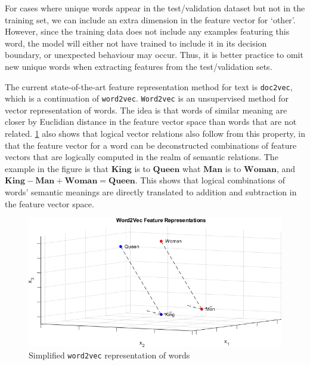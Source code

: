 \documentclass[12pt,a4paper,twoside,openright]{report}
\renewcommand{\vec}[1]{\mathbf{#1}}
\begin{document}
For cases where unique words appear in the test/validation
dataset but not in the training set, we can include an extra dimension in the feature
vector for `other'. However, since the training data does not include any examples featuring
this word, the model will either not have trained to include it in its decision boundary, or unexpected
behaviour may occur. Thus, it is better practice to omit new unique words when extracting features
from the test/validation sets.

The current state-of-the-art feature representation method for text is \texttt{doc2vec}\cite{Le14},
which is a continuation of \texttt{word2vec}\cite{Mikolov13}. \texttt{Word2vec} is an unsupervised method
for vector representation of words. The idea is that words of similar meaning are closer by Euclidian distance in the feature vector space than
words that are not related. \cref{fig:word2vec} also shows that logical vector relations 
also follow from this property, in that the feature vector for a word can be deconstructed
combinations of feature vectors that are logically computed in the realm of semantic relations.
The example in the figure is that $\vec{King}$ is to $\vec{Queen}$ what $\vec{Man}$ is to $\vec{Woman}$,
and $\vec{King} - \vec{Man} + \vec{Woman} = \vec{Queen}$. This shows that
logical combinations of words' semantic meanings are directly translated to addition and subtraction in
the feature vector space.

\begin{figure}[H]
\centering
\vspace{10pt}
\includegraphics[width=\textwidth]{word2vec.png}
\caption{Simplified \texttt{word2vec} representation of words}
\label{fig:word2vec}
\end{figure}
\end{document}

